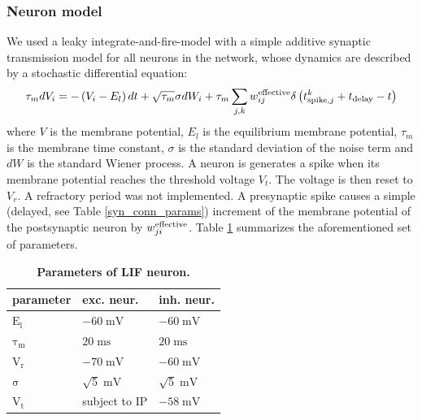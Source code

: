 \documentclass[10pt,letterpaper]{article}
\begin{document}
\subsubsection*{Neuron model}
We used a leaky integrate-and-fire-model with a simple additive synaptic transmission model for all neurons in the network, whose dynamics are described by a stochastic differential equation:
\begin{equation}
{\tau_m}dV_i = -\left( V_i-E_l \right) dt + \sqrt{\tau_m} \sigma dW_i + \tau_m \sum_{j,k} w^{\rm effective}_{ij}\delta \left( t^k_{\mathrm{spike},j} + t_{\rm delay} - t \right)
\label{LIF_Dynamics}
\end{equation}
where $V$ is the membrane potential, $E_l$ is the equilibrium membrane potential, $\tau_m$ is the membrane time constant, $\sigma$ is the standard deviation of the noise term and $dW$ is the standard Wiener process. A neuron is generates a spike when its membrane potential reaches the threshold voltage $V_t$. The voltage is then reset to $V_r$. A refractory period was not implemented. A presynaptic spike causes a simple (delayed, see Table \ref{syn_conn_params}) increment of the membrane potential of the postsynaptic neuron by $w^{\rm effective}_{ji}$. Table \ref{LIF_neuron_params} summarizes the aforementioned set of parameters.
\begin{table}
\caption{\bf Parameters of LIF neuron.}
\begin{tabular}{|l|l|l|}
\hline
\textbf{parameter} & \textbf{exc. neur.} & \textbf{inh. neur.}\\ \hline
$\mathrm{E_l}$ & $\mathrm{-60\;mV}$ & $\mathrm{-60\;mV}$ \\ \hline
$\mathrm{\tau_m}$ & $\mathrm{20\;ms}$ & $\mathrm{20\;ms}$ \\ \hline
$\mathrm{V_r}$ & $\mathrm{-70\;mV}$ & $\mathrm{-60\;mV}$ \\ \hline
$\mathrm{\sigma}$ & $\mathrm{\sqrt{5}\;mV}$ & $\mathrm{\sqrt{5}\;mV}$ \\ \hline
$\mathrm{V_t}$ & subject to IP & $\mathrm{-58\;mV}$ \\ 
\hline
\end{tabular}
\label{LIF_neuron_params}
\end{table}   
\end{document}
